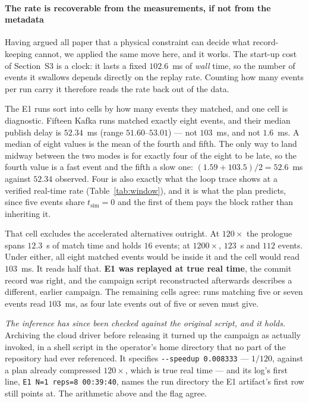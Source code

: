 \documentclass[10pt,journal,onecolumn]{IEEEtran}
\newcommand{\kafka}{Kafka}
\begin{document}
\paragraph{The rate is recoverable from the measurements, if not from the metadata} Having
argued all paper that a physical constraint can decide what record-keeping cannot, we applied the
same move here, and it works. The start-up cost of Section~S3 is a clock: it
lasts a fixed $102.6$~ms of \emph{wall} time, so the number of events it swallows depends
directly on the replay rate. Counting how many events per run carry it therefore reads the rate
back out of the data.

The E1 runs sort into cells by how many events they matched, and one cell is diagnostic. Fifteen
\kafka{} runs matched exactly eight events, and their median publish delay is
$\mathbf{52.34}$~ms (range $51.60$--$53.01$) --- not $103$~ms, and not $1.6$~ms. A median of
eight values is the mean of the fourth and fifth. The only way to land midway between the two
modes is for exactly four of the eight to be late, so the fourth value is a fast event and the
fifth a slow one: $(1.59 + 103.5)/2 = 52.6$~ms against $52.34$ observed. Four is also exactly
what the loop trace shows at a verified real-time rate (Table~\ref{tab:window}), and it is what
the plan predicts, since five events share $t_{\mathrm{sim}}{=}0$ and the first of them pays the
block rather than inheriting it.

That cell excludes the accelerated alternatives outright. At $120\times$ the prologue spans
$12.3$~s of match time and holds $16$ events; at $1200\times$, $123$~s and $112$ events. Under
either, all eight matched events would be inside it and the cell would read $103$~ms. It reads
half that. \textbf{E1 was replayed at true real time}, the commit record was right, and the
campaign script reconstructed afterwards describes a different, earlier campaign. The remaining
cells agree: runs matching five or seven events read $103$~ms, as four late events out of five or
seven must give.

\emph{The inference has since been checked against the original script, and it holds.} Archiving
the cloud driver before releasing it turned up the campaign as actually invoked, in a shell script
in the operator's home directory that no part of the repository had ever referenced. It specifies
\texttt{-{}-speedup 0.008333} --- $1/120$, against a plan already compressed $120\times$, which is
true real time --- and its log's first line, \texttt{E1 N=1 reps=8 00:39:40}, names the run
directory the E1 artifact's first row still points at. The arithmetic above and the flag agree.
\end{document}
